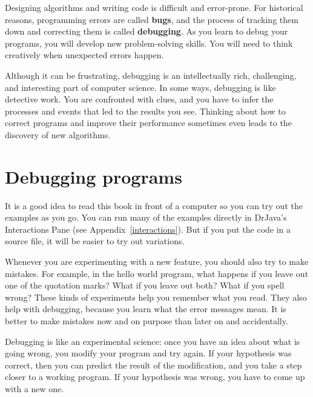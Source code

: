 
Designing algorithms and writing code is difficult and error-prone.
For historical reasons, programming errors are called {\bf bugs}, and the process of tracking them down and correcting them is called {\bf debugging}.
As you learn to debug your programs, you will develop new problem-solving skills.
You will need to think creatively when unexpected errors happen.

Although it can be frustrating, debugging is an intellectually rich, challenging, and interesting part of computer science.
In some ways, debugging is like detective work.
You are confronted with clues, and you have to infer the processes and events that led to the results you see.
Thinking about how to correct programs and improve their performance sometimes even leads to the discovery of new algorithms.


\section{Debugging programs}
\label{sec:examples}

It is a good idea to read this book in front of a computer so you can try out the examples as you go.
You can run many of the examples directly in DrJava's Interactions Pane (see Appendix~\ref{interactions}).
But if you put the code in a source file, it will be easier to try out variations.


Whenever you are experimenting with a new feature, you should also try to make mistakes.
For example, in the hello world program, what happens if you leave out one of the quotation marks?
What if you leave out both?
What if you spell  wrong?
These kinds of experiments help you remember what you read.
They also help with debugging, because you learn what the error messages mean.
It is better to make mistakes now and on purpose than later on and accidentally.



Debugging is like an experimental science: once you have an idea about what is going wrong, you modify your program and try again.
If your hypothesis was correct, then you can predict the result of the modification, and you take a step closer to a working program.
If your hypothesis was wrong, you have to come up with a new one.

